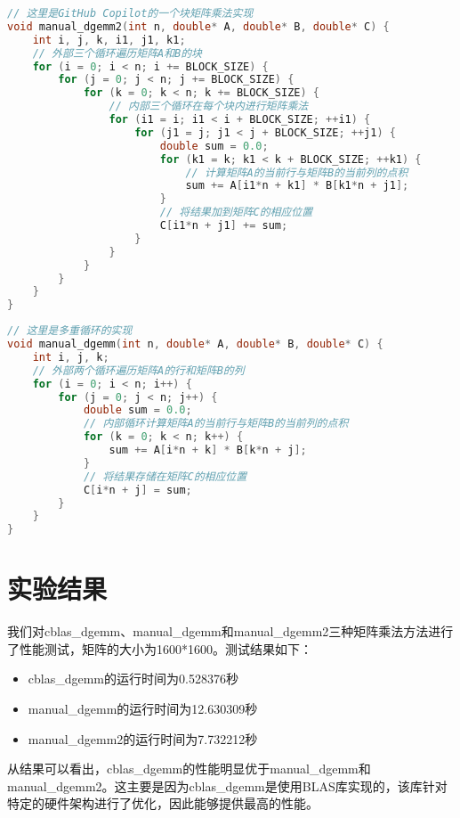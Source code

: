 \documentclass{ctexart}
\begin{document}
\begin{lstlisting}[language=C, breaklines=true]
// 这里是GitHub Copilot的一个块矩阵乘法实现
void manual_dgemm2(int n, double* A, double* B, double* C) {
    int i, j, k, i1, j1, k1;
    // 外部三个循环遍历矩阵A和B的块
    for (i = 0; i < n; i += BLOCK_SIZE) {
        for (j = 0; j < n; j += BLOCK_SIZE) {
            for (k = 0; k < n; k += BLOCK_SIZE) {
                // 内部三个循环在每个块内进行矩阵乘法
                for (i1 = i; i1 < i + BLOCK_SIZE; ++i1) {
                    for (j1 = j; j1 < j + BLOCK_SIZE; ++j1) {
                        double sum = 0.0;
                        for (k1 = k; k1 < k + BLOCK_SIZE; ++k1) {
                            // 计算矩阵A的当前行与矩阵B的当前列的点积
                            sum += A[i1*n + k1] * B[k1*n + j1];
                        }
                        // 将结果加到矩阵C的相应位置
                        C[i1*n + j1] += sum;
                    }
                }
            }
        }
    }
}
\end{lstlisting}

\begin{lstlisting}[language=C, breaklines=true]
// 这里是多重循环的实现
void manual_dgemm(int n, double* A, double* B, double* C) {
    int i, j, k;
    // 外部两个循环遍历矩阵A的行和矩阵B的列
    for (i = 0; i < n; i++) {
        for (j = 0; j < n; j++) {
            double sum = 0.0;
            // 内部循环计算矩阵A的当前行与矩阵B的当前列的点积
            for (k = 0; k < n; k++) {
                sum += A[i*n + k] * B[k*n + j];
            }
            // 将结果存储在矩阵C的相应位置
            C[i*n + j] = sum;
        }
    }
}
\end{lstlisting}

\section{实验结果}
我们对cblas\_dgemm、manual\_dgemm和manual\_dgemm2三种矩阵乘法方法进行了性能测试，矩阵的大小为1600*1600。测试结果如下：

\begin{itemize}
\item cblas\_dgemm的运行时间为0.528376秒
\item manual\_dgemm的运行时间为12.630309秒
\item manual\_dgemm2的运行时间为7.732212秒
\end{itemize}

从结果可以看出，cblas\_dgemm的性能明显优于manual\_dgemm和manual\_dgemm2。这主要是因为cblas\_dgemm是使用BLAS库实现的，该库针对特定的硬件架构进行了优化，因此能够提供最高的性能。
\end{document}
